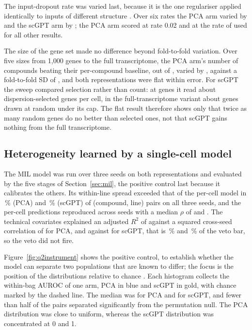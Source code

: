 The input-dropout rate was varied last, because it is the one regulariser applied identically to
inputs of different structure \cite{srivastava2014}. Over six rates the PCA arm varied by
\DropRangePca{} and the scGPT arm by \DropRangeScgpt{}; the PCA arm scored \DropBestPca{} at rate 0.02
and \DropShippedPca{} at the rate of \CfgInDrop{} used for all other results.

The size of the gene set made no difference beyond fold-to-fold variation. Over five sizes from
1{,}000 genes to the full transcriptome, the PCA arm's number of compounds beating their per-compound
baseline, out of \NDrugsModelled{}, varied by \SweepRangePca{}, against a fold-to-fold SD of \SweepFoldSd{}, and both representations were flat within error. For scGPT the sweep compared
selection rather than count: at \NHvg{} genes it read about \GenesSeenHvg{} dispersion-selected genes per
cell, in the full-transcriptome variant about \GenesSeenAll{} genes drawn at random under its cap. The
flat result therefore shows only that twice as many random genes do no better than selected ones, not
that scGPT gains nothing from the full transcriptome.

\subsection{Heterogeneity learned by a single-cell model}
\label{sec:results-q3}

The MIL model \cite{dietterich1997,ilse2018} was run over three seeds on both representations and
evaluated by the five stages of Section~\ref{sec:mil}, the positive control last because it calibrates
the others.
Its within-line spread exceeded that of the per-cell model in \QSpreadPca\,\% (PCA) and
\QSpreadScgpt\,\% (scGPT) of (compound, line) pairs on all three seeds, and the per-cell predictions
reproduced across seeds with a median $\rho$ of \QSeedRhoPca{} and \QSeedRhoScgpt{}. The technical
covariates explained an adjusted $R^2$ of \QConfPca{} against a squared cross-seed correlation of
\QReprPca{} for PCA, and \QConfScgpt{} against \QReprScgpt{} for scGPT, that is \QBarPca\,\% and
\QBarScgpt\,\% of the veto bar, so the veto did not fire.

Figure~\ref{fig:q2instrument} shows the positive control, to establish whether the model can separate
two populations that are known to differ; the focus is the position of the distributions relative to
chance \cite{hanley1982}. Each histogram collects the within-bag AUROC of one arm, PCA in blue and
scGPT in gold, with chance marked by the dashed line. The median was \QAurocPca{} for PCA and
\QAurocScgpt{} for scGPT, and fewer than half of the pairs separated significantly from the permutation
null. The PCA distribution was close to uniform, whereas the scGPT distribution was concentrated at 0
and 1.

